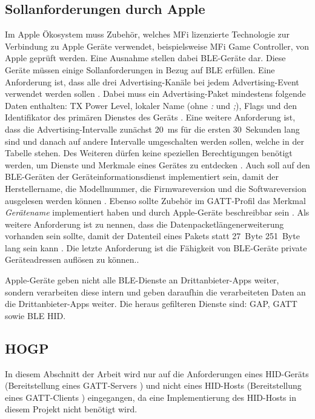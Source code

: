 \subsection{Sollanforderungen durch Apple}
Im Apple Ökosystem muss Zubehör, welches \ac{MFi} lizenzierte Technologie zur Verbindung zu Apple Geräte verwendet, beispielsweise \ac{MFi} Game Controller, von Apple geprüft werden. Eine Ausnahme stellen dabei \ac{BLE}-Geräte dar. \cite{appleMfiProgram} Diese Geräte müssen einige Sollanforderungen in Bezug auf \ac{BLE} erfüllen. Eine Anforderung ist, dass alle drei Advertising-Kanäle bei jedem Advertising-Event verwendet werden sollen \cite[S.~186]{appleDesignGuide}. Dabei muss ein Advertising-Paket mindestens folgende Daten enthalten: TX Power Level, lokaler Name (ohne \textit{:} und \textit{;}), Flags und den Identifikator des primären Dienstes des Geräts \cite[S.~186f.]{appleDesignGuide}. Eine weitere Anforderung ist, dass die Advertising-Intervalle zunächst 20~ms für die ersten 30~Sekunden lang sind und danach auf andere Intervalle umgeschalten werden sollen, welche in der Tabelle \cite[S.~187]{appleDesignGuide} stehen. Des Weiteren dürfen keine speziellen Berechtigungen benötigt werden, um Dienste und Merkmale eines Gerätes zu entdecken \cite[S.~190]{appleDesignGuide}. Auch soll auf den \ac{BLE}-Geräten der Geräteinformationsdienst implementiert sein, damit der Herstellername, die Modellnummer, die Firmwareversion und die Softwareversion ausgelesen werden können \cite[S.~191]{appleDesignGuide}. Ebenso sollte Zubehör im \ac{GATT}-Profil das Merkmal \textit{Gerätename} implementiert haben und durch Apple-Geräte beschreibbar sein \cite[S.~190]{appleDesignGuide}. Als weitere Anforderung ist zu nennen, dass die Datenpacketlängenerweiterung vorhanden sein sollte, damit der Datenteil eines Pakets statt 27~Byte 251~Byte lang sein kann \cite[S.~189]{appleDesignGuide}. Die letzte Anforderung ist die Fähigkeit von \ac{BLE}-Geräte private Geräteadressen auflösen zu können.\cite[S.~189]{appleDesignGuide}.

Apple-Geräte geben nicht alle \ac{BLE}-Dienste an Drittanbieter-Apps weiter, sondern verarbeiten diese intern und geben daraufhin die verarbeiteten Daten an die Drittanbieter-Apps weiter. Die heraus gefilteren Dienste sind: \ac{GAP}, \ac{GATT} sowie \ac{BLE} \ac{HID}. \cite[S.~192]{appleDesignGuide}

\subsection{\acf{HOGP}}
In diesem Abschnitt der Arbeit wird nur auf die Anforderungen eines \acs{HID}-Geräts (Bereitstellung eines \acs{GATT}-Servers \cite[S.~9]{bluetoothHOGP}) und nicht eines \acs{HID}-Hosts (Bereitstellung eines \acs{GATT}-Clients \cite[S.~9]{bluetoothHOGP}) eingegangen, da eine Implementierung des \acs{HID}-Hosts in diesem Projekt nicht benötigt wird.

